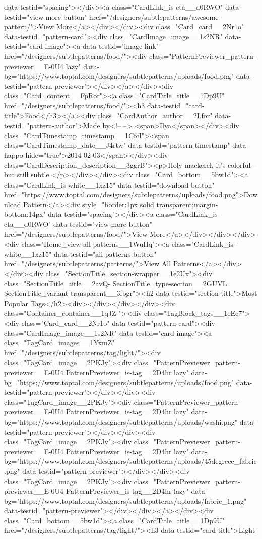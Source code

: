 data-testid="spacing"></div><a class="CardLink_is-cta__d0RWO" data-testid="view-more-button" href="/designers/subtlepatterns/awesome-pattern/">View More</a></div></div><div class="Card_card__2Nr1o" data-testid="pattern-card"><div class="CardImage_image__1s2NR" data-testid="card-image"><a data-testid="image-link" href="/designers/subtlepatterns/food/"><div class="PatternPreviewer_pattern-previewer__E-0U4 lazy" data-bg="https://www.toptal.com/designers/subtlepatterns/uploads/food.png" data-testid="pattern-previewer"></div></a></div><div class="Card_content__FpRor"><a class="CardTitle_title__1Dp9U" href="/designers/subtlepatterns/food/"><h3 data-testid="card-title">Food</h3></a><div class="CardAuthor_author__2Lfor" data-testid="pattern-author">Made by<!-- --> <span>Ilya</span></div><div class="CardTimestamp_timestamp__1CfcI"><span class="CardTimestamp_date__J4rtw" data-testid="pattern-timestamp" data-happo-hide="true">2014-02-03</span></div><div class="CardDescription_description__3ggrB"><p>Holy mackerel, it’s colorful—but still subtle.</p></div></div><div class="Card_bottom__5bw1d"><a class="CardLink_is-white__1xz15" data-testid="download-button" href="https://www.toptal.com/designers/subtlepatterns/uploads/food.png">Download Pattern</a><div style="border:1px solid transparent;margin-bottom:14px" data-testid="spacing"></div><a class="CardLink_is-cta__d0RWO" data-testid="view-more-button" href="/designers/subtlepatterns/food/">View More</a></div></div></div><div class="Home_view-all-patterns__1WuHq"><a class="CardLink_is-white__1xz15" data-testid="all-patterns-button" href="/designers/subtlepatterns/patterns/">View All Patterns</a></div></div><div class="SectionTitle_section-wrapper__1e2Ux"><div class="SectionTitle_title__2avQ- SectionTitle_type-section__2GUVL SectionTitle_variant-transparent__3fbgr"><h2 data-testid="section-title">Most Popular Tags</h2><div></div></div></div><div class="Container_container__1qJZ-"><div class="TagBlock_tags__1eEe7"><div class="Card_card__2Nr1o" data-testid="pattern-card"><div class="CardImage_image__1s2NR" data-testid="card-image"><a class="TagCard_images__1YxmZ" href="/designers/subtlepatterns/tag/light/"><div class="TagCard_image__2PKJy"><div class="PatternPreviewer_pattern-previewer__E-0U4 PatternPreviewer_is-tag__2D4hr lazy" data-bg="https://www.toptal.com/designers/subtlepatterns/uploads/food.png" data-testid="pattern-previewer"></div></div><div class="TagCard_image__2PKJy"><div class="PatternPreviewer_pattern-previewer__E-0U4 PatternPreviewer_is-tag__2D4hr lazy" data-bg="https://www.toptal.com/designers/subtlepatterns/uploads/washi.png" data-testid="pattern-previewer"></div></div><div class="TagCard_image__2PKJy"><div class="PatternPreviewer_pattern-previewer__E-0U4 PatternPreviewer_is-tag__2D4hr lazy" data-bg="https://www.toptal.com/designers/subtlepatterns/uploads/45degreee_fabric.png" data-testid="pattern-previewer"></div></div><div class="TagCard_image__2PKJy"><div class="PatternPreviewer_pattern-previewer__E-0U4 PatternPreviewer_is-tag__2D4hr lazy" data-bg="https://www.toptal.com/designers/subtlepatterns/uploads/fabric_1.png" data-testid="pattern-previewer"></div></div></a></div><div class="Card_bottom__5bw1d"><a class="CardTitle_title__1Dp9U" href="/designers/subtlepatterns/tag/light/"><h3 data-testid="card-title">Light 
